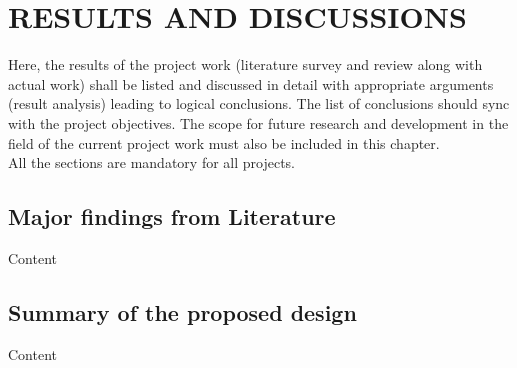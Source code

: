\chapter{RESULTS AND DISCUSSIONS } %
\label{ChapterResults} %

Here, the results of the project work (literature survey and review along with actual work) shall be listed and discussed in detail with appropriate arguments (result analysis) leading to logical conclusions. The list of conclusions should sync with the project objectives. The scope for future research and development in the field of the current project work must also be included in this chapter.  \\

All the sections are mandatory for all projects. 



\section{Major findings from Literature}
Content

\section{Summary of the proposed design}
Content
